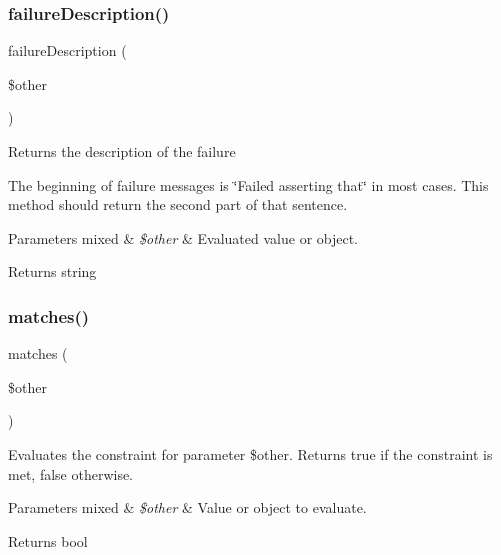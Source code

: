\subsubsection{\texorpdfstring{failure\+Description()}{failureDescription()}}
{\footnotesize\ttfamily failure\+Description (\begin{DoxyParamCaption}\item[{}]{\$other }\end{DoxyParamCaption})\hspace{0.3cm}{\ttfamily [protected]}}

Returns the description of the failure

The beginning of failure messages is \char`\"{}\+Failed asserting that\char`\"{} in most cases. This method should return the second part of that sentence.


\begin{DoxyParams}[1]{Parameters}
mixed & {\em \$other} & Evaluated value or object.\\
\hline
\end{DoxyParams}
\begin{DoxyReturn}{Returns}
string 
\end{DoxyReturn}
\mbox{\label{class_p_h_p_unit___framework___constraint___exception_a9c9c337de483bbdbb9fa249a6c7c9cc5}} 
\subsubsection{\texorpdfstring{matches()}{matches()}}
{\footnotesize\ttfamily matches (\begin{DoxyParamCaption}\item[{}]{\$other }\end{DoxyParamCaption})\hspace{0.3cm}{\ttfamily [protected]}}

Evaluates the constraint for parameter \$other. Returns true if the constraint is met, false otherwise.


\begin{DoxyParams}[1]{Parameters}
mixed & {\em \$other} & Value or object to evaluate.\\
\hline
\end{DoxyParams}
\begin{DoxyReturn}{Returns}
bool 
\end{DoxyReturn}
\mbox{\label{class_p_h_p_unit___framework___constraint___exception_a5558c5d549f41597377fa1ea8a1cefa3}} 
